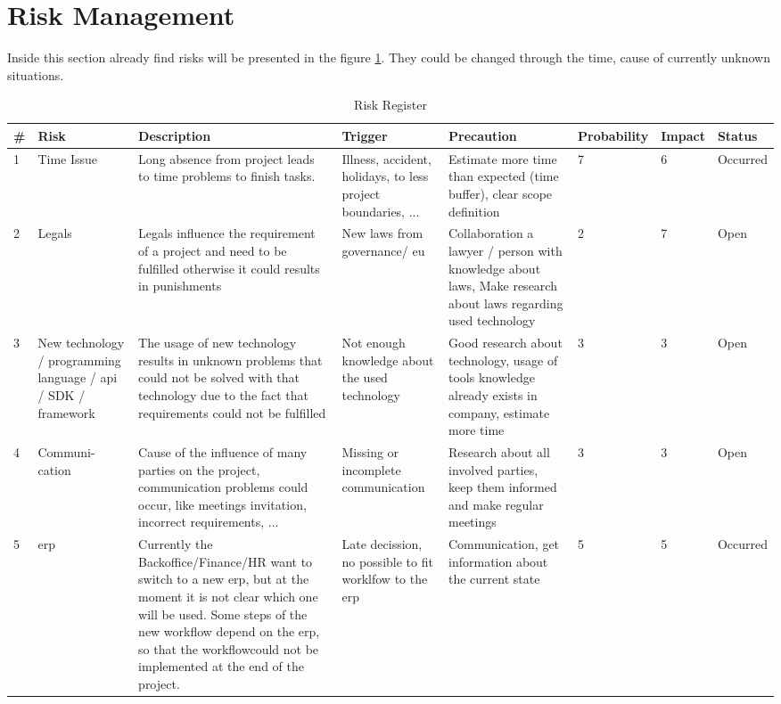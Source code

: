 \section{Risk Management}
Inside this section already find risks will be presented in the figure \ref{fig:risks}. They could be changed through the time, cause of currently unknown situations.
\begin{center}
	\begin{landscape}
		\begin{table}[h]
			\begin{tabular}{|p{}|p{2cm}|p{4cm}|p{4cm}|p{4cm}|p{1,5cm}|p{}|p{}|} \hline
				\rowcolor{Gray} \# & Risk & Description & Trigger & Precaution & Probability & Impact & Status \\ \hline
				1 & Time Issue & Long absence from project leads to time problems to finish tasks. & Illness, accident, holidays, to less project boundaries, ... & Estimate more time than expected (time buffer), clear scope definition & 7 & 6 & Occurred \\ \hline
				2 & Legals & Legals influence the requirement of a project and need to be fulfilled otherwise it could results in punishments & New laws from governance/ \gls{eu} & Collaboration a lawyer / person with knowledge about laws, Make research about laws regarding used technology & 2 & 7 & Open \\ \hline
				3 & New technology / programming language / \gls{api} / \gls{SDK} / framework & The usage of new technology results	in unknown problems that could not be solved with that technology due to the fact that requirements could not be fulfilled & Not enough knowledge about 	the used technology & Good research about technology, usage of tools knowledge already exists in company, estimate more time & 3 & 3 & Open \\ \hline
				4 & Communi- cation & Cause of the influence of many parties on the project, communication problems could occur, like meetings invitation, incorrect requirements, ... & Missing or incomplete communication & Research about all involved parties, keep them informed and make regular meetings & 3 & 3 & Open \\ \hline
				5 & \gls{erp} & Currently the Backoffice/Finance/HR	want to switch to a new \gls{erp},
				but at the moment it is not clear which	one will be used. Some steps of	the new workflow depend on the \gls{erp}, so that the workflowcould not be implemented at the end	of the project. & Late decission, no possible to fit worklfow to the \gls{erp} & Communication, get information about the current state & 5 & 5 & Occurred \\ \hline
			\end{tabular}
			\caption{Risk Register}
			\label{fig:risks}
		\end{table}
	\end{landscape}
\end{center}
